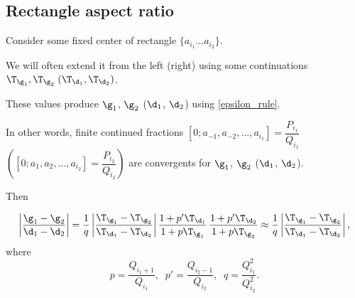 \subsection{Rectangle aspect ratio}

Consider some fixed center of rectangle $\{a_{i_1} ... a_{i_2}\}$.

We will often extend it from the left (right) using some continuations
$\T_{\g_1}, \T_{\g_2}\; (\T_{\d_1}, \T_{\d_2})$.

These values produce $\g_1$, $\g_2$ ($\d_1$, $\d_2$)
using \ref{epsilon_rule}.

In other words, finite continued fractions
$[0; a_{-1}, a_{-2}, ..., a_{i_1}] = \dfrac{P_{i_1}}{Q_{i_1}}$
$\left([0; a_{1}, a_{2}, ..., a_{i_2}] = \dfrac{P_{i_2}}{Q_{i_2}}\right)$
are convergents for $\g_1$, $\g_2$ ($\d_1$, $\d_2$).

Then

\begin{equation}%
	\left| \dfrac{\g_1 - \g_2}{\d_1 - \d_2} \right|
	=
	\dfrac{1}{q}
	\left| \dfrac{\T_{\g_1} - \T_{\g_2}}
	{\T_{\d_1} - \T_{\d_2}} \right|
	\dfrac{1 + p' \T_{\d_1}}{1 + p \T_{\g_1}}\,
	\dfrac{1 + p' \T_{\d_2}}{1 + p \T_{\g_2}}
	\approx
	\dfrac{1}{q}
	\left| \dfrac{\T_{\g_1} - \T_{\g_2}}
	{\T_{\d_1} - \T_{\d_2}} \right|,
\end{equation}
where
\begin{equation*}
	p = \dfrac{Q_{i_1 + 1}}{Q_{i_1}},\;\;
	p' = \dfrac{Q_{i_2 - 1}}{Q_{i_2}},\;\;
	q = \dfrac{Q_{i_1}^2}{Q_{i_2}^2}.
\end{equation*}
